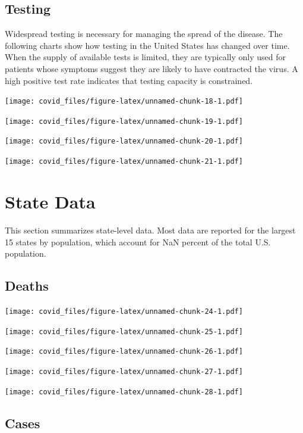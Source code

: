 \documentclass[]{article}
\begin{document}
\newpage

\hypertarget{testing}{%
\subsection{Testing}\label{testing}}

Widespread testing is necessary for managing the spread of the disease.
The following charts show how testing in the United States has changed
over time. When the supply of available tests is limited, they are
typically only used for patients whose symptoms suggest they are likely
to have contracted the virus. A high positive test rate indicates that
testing capacity is constrained.

\texttt{[image: covid\_files/figure-latex/unnamed-chunk-18-1.pdf]}

\texttt{[image: covid\_files/figure-latex/unnamed-chunk-19-1.pdf]}

\texttt{[image: covid\_files/figure-latex/unnamed-chunk-20-1.pdf]}

\texttt{[image: covid\_files/figure-latex/unnamed-chunk-21-1.pdf]}

\newpage

\hypertarget{state-data}{%
\section{State Data}\label{state-data}}

This section summarizes state-level data. Most data are reported for the
largest 15 states by population, which account for NaN percent of the
total U.S. population.

\hypertarget{deaths-1}{%
\subsection{Deaths}\label{deaths-1}}

\texttt{[image: covid\_files/figure-latex/unnamed-chunk-24-1.pdf]}

\texttt{[image: covid\_files/figure-latex/unnamed-chunk-25-1.pdf]}

\texttt{[image: covid\_files/figure-latex/unnamed-chunk-26-1.pdf]}
\newpage

\texttt{[image: covid\_files/figure-latex/unnamed-chunk-27-1.pdf]}

\texttt{[image: covid\_files/figure-latex/unnamed-chunk-28-1.pdf]}

\newpage

\hypertarget{cases-1}{%
\subsection{Cases}\label{cases-1}}
\end{document}
